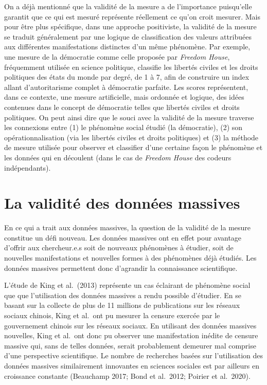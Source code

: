 \documentclass[
  letterpaper,
]{scrbook}
\begin{document}
On a déjà mentionné que la validité de la mesure a de l'importance
puisqu'elle garantit que ce qui est mesuré représente réellement ce
qu'on croit mesurer. Mais pour être plus spécifique, dans une approche
positiviste, la validité de la mesure se traduit généralement par une
logique de classification des valeurs attribuées aux différentes
manifestations distinctes d'un même phénomène. Par exemple, une mesure
de la démocratie comme celle proposée par \emph{Freedom House},
fréquemment utilisée en science politique, classifie les libertés
civiles et les droits politiques des états du monde par degré, de 1 à 7,
afin de construire un index allant d'autoritarisme complet à démocratie
parfaite. Les scores représentent, dans ce contexte, une mesure
artificielle, mais ordonnée et logique, des idées contenues dans le
concept de démocratie telles que libertés civiles et droits politiques.
On peut ainsi dire que le souci avec la validité de la mesure traverse
les connexions entre (1) le phénomène social étudié (la démocratie), (2)
son opérationnalisation (via les libertés civiles et droits politiques)
et (3) la méthode de mesure utilisée pour observer et classifier d'une
certaine façon le phénomène et les données qui en découlent (dans le cas
de \emph{Freedom House} des codeurs indépendants).

\hypertarget{la-validituxe9-des-donnuxe9es-massives}{%
\section{La validité des données
massives}\label{la-validituxe9-des-donnuxe9es-massives}}

En ce qui a trait aux données massives, la question de la validité de la
mesure constitue un défi nouveau. Les données massives ont en effet pour
avantage d'offrir aux chercheur.e.s soit de nouveaux phénomènes à
étudier, soit de nouvelles manifestations et nouvelles formes à des
phénomènes déjà étudiés. Les données massives permettent donc d'agrandir
la connaissance scientifique.

L'étude de King et al.~(2013) représente un cas éclairant de phénomène
social que que l'utilisation des données massives a rendu possible
d'étudier. En se basant sur la collecte de plus de 11 millions de
publications sur les réseaux sociaux chinois, King et al.~ont pu mesurer
la censure exercée par le gouvernement chinois sur les réseaux sociaux.
En utilisant des données massives nouvelles, King et al.~ont donc pu
observer une manifestation inédite de censure massive qui, sans de
telles données, serait probablement demeurer mal comprise d'une
perspective scientifique. Le nombre de recherches basées sur
l'utilisation des données massives similairement innovantes en sciences
sociales est par ailleurs en croissance constante (Beauchamp 2017; Bond
et al.~2012; Poirier et al.~2020).
\end{document}
